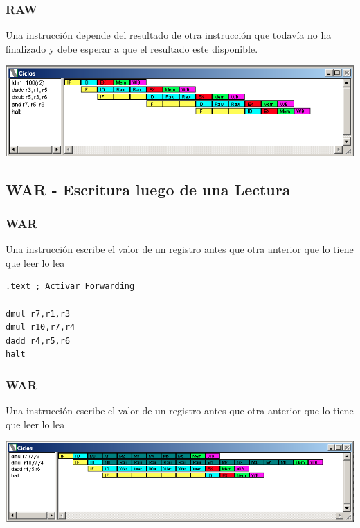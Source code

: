 \documentclass{beamer}
\begin{document}
\begin{frame}[fragile]
\frametitle{RAW}
Una instrucción depende del resultado de otra instrucción que todavía no ha finalizado y debe esperar a que el resultado este disponible.
\begin{block}{}
\includegraphics[scale=0.45]{raw.png}
\end{block}

\end{frame}


\subsection{WAR - Escritura luego de una Lectura}
\begin{frame}[fragile]
\frametitle{WAR}
Una instrucción escribe el valor de un registro antes que otra anterior que lo tiene que leer lo lea
\begin{block}{}
\begin{lstlisting}[language=WinMIPS64,basicstyle=\ttfamily,keywordstyle=\color{blue}]
.text ; Activar Forwarding

dmul r7,r1,r3
dmul r10,r7,r4
dadd r4,r5,r6
halt
\end{lstlisting}
\end{block}

\end{frame}


\begin{frame}[fragile]
\frametitle{WAR}
Una instrucción escribe el valor de un registro antes que otra anterior que lo tiene que leer lo lea
\begin{block}{}
\includegraphics[scale=0.45]{war.png}
\end{block}
\end{frame}
\end{document}
